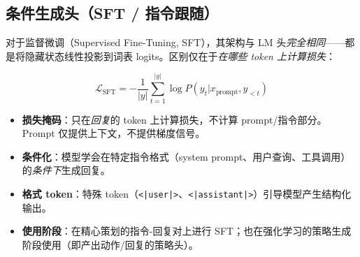 \subsection{条件生成头（SFT / 指令跟随）}
\label{conditional-generation-head-sft-instruction-following}

对于监督微调（Supervised Fine-Tuning, SFT），其架构与 LM 头\emph{完全相同}——都是将隐藏状态线性投影到词表 logits。区别仅在于\emph{在哪些 token 上计算损失}：

\begin{equation}
\mathcal{L}_{\text{SFT}} = -\frac{1}{|y|}\sum_{t=1}^{|y|} \log P(y_t | x_{\text{prompt}}, y_{<t})
\end{equation}

\begin{keybox}
\begin{itemize}
  \item \textbf{损失掩码}：只在\emph{回复}的 token 上计算损失，不计算 prompt/指令部分。Prompt 仅提供上下文，不提供梯度信号。
  \item \textbf{条件化}：模型学会在特定指令格式（system prompt、用户查询、工具调用）的\emph{条件下}生成回复。
  \item \textbf{格式 token}：特殊 token（\texttt{<|user|>}、\texttt{<|assistant|>}）引导模型产生结构化输出。
  \item \textbf{使用阶段}：在精心策划的指令-回复对上进行 SFT；也在强化学习的策略生成阶段使用（即产出动作/回复的策略头）。
\end{itemize}
\end{keybox}

